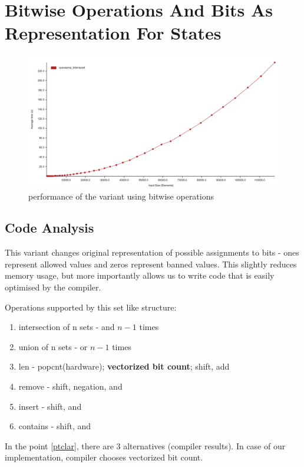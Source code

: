\documentclass[shortabstract, english, inz]{iithesis}
\begin{document}
\section{Bitwise Operations And Bits As Representation For States}
\label{stack}
\begin{figure}[H]
\centering
\includegraphics[width=1\textwidth, angle=0]{images/queueprop_bitarrayset_performance.png}
\caption{performance of the variant using bitwise operations}
\label{fig:queue_bitarrayset_performance}
\end{figure}
\label{bitwise}
\subsection{Code Analysis}
This variant changes original representation of possible assignments to bits - ones represent allowed values and zeros represent banned values. This slightly reduces memory usage, but more importantly allows us to write code that is easily optimised by the compiler.

Operations supported by this set like structure:
\begin{enumerate}
    \item intersection of n sets - and \(n - 1\)  times
    \item union of n sets - or \(n - 1\)  times
    \item \label{ptclar}len - popcnt(hardware); \textbf{vectorized bit count}; shift, add
    \item remove - shift, negation, and
    \item insert - shift, and
    \item contains - shift, and
\end{enumerate}
In the point \ref{ptclar}, there are 3 alternatives (compiler results). In case of our implementation, compiler chooses vectorized bit count.
\end{document}
